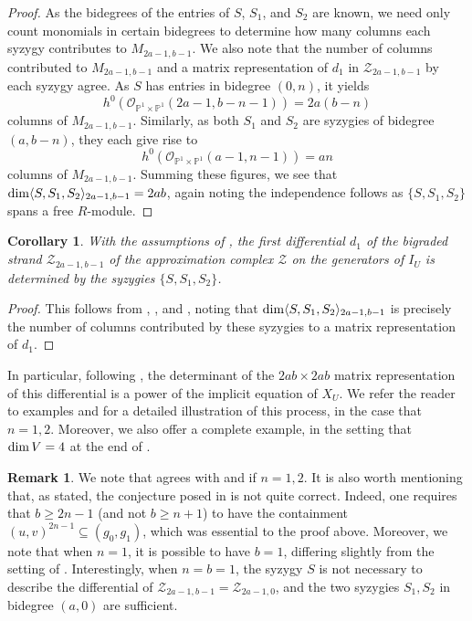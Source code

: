 \documentclass[reqno]{amsart}
\newtheorem{cor}[thm]{Corollary}
\numberwithin{equation}{section}
\theoremstyle{definition}
\newtheorem{rem}[thm]{Remark}
\def\O{\mathcal{O}}
\def\P{\mathbb{P}}
\def\Z{\mathcal{Z}}
\def\dim{\mathop{\rm dim}}
\begin{document}
\begin{proof}
As the bidegrees of the entries of $S$, $S_1$, and $S_2$ are known, we need only count monomials in certain bidegrees to determine how many columns each syzygy contributes to $M_{2a-1,b-1}$. We also note that the number of columns contributed to $M_{2a-1,b-1}$ and a matrix representation of $d_1$ in $\Z_{2a-1,b-1}$ by each syzygy agree. As $S$ has entries in bidegree $(0,n)$, it yields
$$h^0(\O_{\P^1\times \P^1}(2a-1,b-n-1)) = 2a(b-n)$$
columns of $M_{2a-1,b-1}$. Similarly, as both $S_1$ and $S_2$ are syzygies of bidegree $(a,b-n)$, they each give rise to
$$h^0(\O_{\P^1\times \P^1}(a-1,n-1)) = an$$
columns of $M_{2a-1,b-1}$. Summing these figures, we see that $\dim \langle S,S_1,S_2\rangle_{2a-1,b-1} = 2ab$, again noting the independence follows as $\{S,S_1,S_2\}$ spans a free $R$-module.
\end{proof}


\begin{cor}
With the assumptions of , the first differential $d_1$ of the bigraded strand $\Z_{2a-1,b-1}$ of the approximation complex $\Z$ on the generators of $I_U$ is determined by the syzygies $\{S,S_1,S_2\}$. 
\end{cor}

\begin{proof}
This follows from , , and , noting that $\dim \langle S,S_1,S_2\rangle_{2a-1,b-1}$ is precisely the number of columns contributed by these syzygies to a matrix representation of $d_1$.
\end{proof}

In particular, following , the determinant of the $2ab\times 2ab$ matrix representation of this differential is a power of the implicit equation of $X_U$. We refer the reader to examples \cite[1.3]{DS16} and \cite[4.5]{Weaver25} for a detailed illustration of this process, in the case that $n=1,2$. Moreover, we also offer a complete example, in the setting that $\dim V=4$ at the end of .




\begin{rem}
 We note that  agrees with \cite[2.2]{DS16} and \cite[4.3]{Weaver25} if $n=1,2$. It is also worth mentioning that, as stated, the conjecture posed in \cite[6.4]{Weaver25} is not quite correct. Indeed, one requires that $b\geq 2n-1$ (and not $b\geq n+1$) to have the containment $(u,v)^{2n-1}\subseteq (g_0,g_1)$, which was essential to the proof above. Moreover, we note that when $n=1$, it is possible to have $b=1$, differing slightly from the setting of \cite{DS16}. Interestingly, when $n=b=1$, the syzygy $S$ is not necessary to describe the differential of $\Z_{2a-1,b-1}= \Z_{2a-1,0}$, and the two syzygies $S_1,S_2$ in bidegree $(a,0)$ are sufficient. 
\end{rem}
\end{document}
